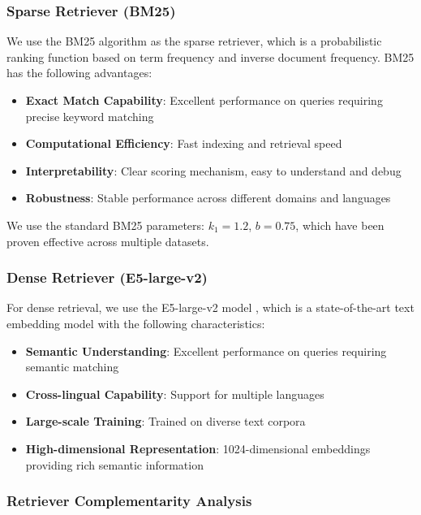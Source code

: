 \documentclass[letterpaper]{article} %
\begin{document}
\subsubsection{Sparse Retriever (BM25)}

We use the BM25 algorithm as the sparse retriever, which is a probabilistic ranking function based on term frequency and inverse document frequency. BM25 has the following advantages:

\begin{itemize}
\item \textbf{Exact Match Capability}: Excellent performance on queries requiring precise keyword matching
\item \textbf{Computational Efficiency}: Fast indexing and retrieval speed
\item \textbf{Interpretability}: Clear scoring mechanism, easy to understand and debug
\item \textbf{Robustness}: Stable performance across different domains and languages
\end{itemize}

We use the standard BM25 parameters: $k_1 = 1.2$, $b = 0.75$, which have been proven effective across multiple datasets.

\subsubsection{Dense Retriever (E5-large-v2)}

For dense retrieval, we use the E5-large-v2 model \cite{wang2022text}, which is a state-of-the-art text embedding model with the following characteristics:

\begin{itemize}
\item \textbf{Semantic Understanding}: Excellent performance on queries requiring semantic matching
\item \textbf{Cross-lingual Capability}: Support for multiple languages
\item \textbf{Large-scale Training}: Trained on diverse text corpora
\item \textbf{High-dimensional Representation}: 1024-dimensional embeddings providing rich semantic information
\end{itemize}

\subsubsection{Retriever Complementarity Analysis}
\end{document}
